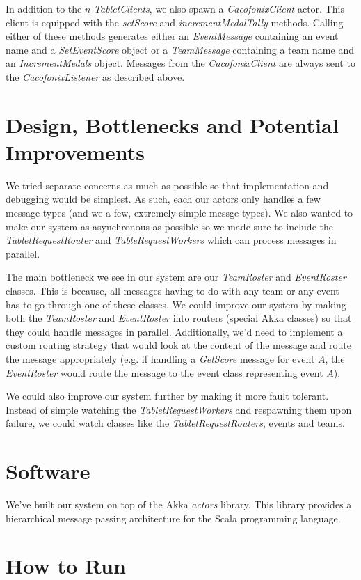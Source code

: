 \documentclass[11pt]{article}
\begin{document}
In addition to the $n$ \emph{TabletClients}, we also spawn a
\emph{CacofonixClient} actor.  This client is equipped with the
\emph{setScore} and \emph{incrementMedalTally} methods.  Calling
either of these methods generates either an \emph{EventMessage}
containing an event name and a \emph{SetEventScore} object or a
\emph{TeamMessage} containing a team name and an
\emph{IncrementMedals} object.  Messages from the
\emph{CacofonixClient} are always sent to the \emph{CacofonixListener}
as described above.

\section{Design, Bottlenecks and Potential Improvements}
We tried separate concerns as much as possible so that implementation
and debugging would be simplest.  As such, each our actors only
handles a few message types (and we a few, extremely simple
messge types).  We also wanted to make our system as
asynchronous as possible so we made sure to include the
\emph{TabletRequestRouter} and \emph{TableRequestWorkers} which can
process messages in parallel.

The main bottleneck we see in our system are our \emph{TeamRoster} and
\emph{EventRoster} classes.  This is because, all messages having to
do with any team or any event has to go through one of these classes.
We could improve our system by making both the \emph{TeamRoster} and
\emph{EventRoster} into routers (special Akka classes) so that they
could handle messages in parallel.  Additionally, we'd need to
implement a custom routing strategy that would look at the content of
the message and route the message appropriately (e.g. if handling a
\emph{GetScore} message for event $A$, the \emph{EventRoster} would
route the message to the event class representing event $A$).

We could also improve our system further by making it more fault
tolerant.  Instead of simple watching the \emph{TabletRequestWorkers}
and respawning them upon failure, we could watch classes like the
\emph{TabletRequestRouters}, events and teams.

\section{Software}
We've built our system on top of the Akka \emph{actors} library.  This
library provides a hierarchical message passing architecture for the
Scala programming language.

\section{How to Run}
\end{document}
